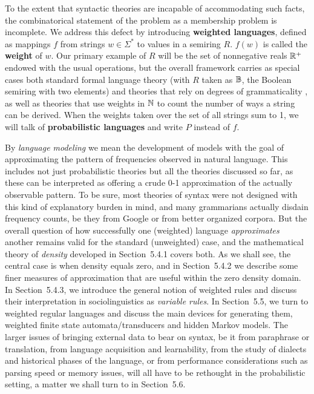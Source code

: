 To the extent that syntactic theories are incapable of accommodating such
facts, the combinatorical statement of the problem as a membership problem is
incomplete.  We address this defect by introducing {\bf weighted languages},
defined as mappings $f$ from strings $w \in \Sigma^*$ to values in a semiring
$R$. $f(w)$ is called the {\bf weight} of
$w$. Our primary example
of $R$ will be the set of nonnegative reals ${\Bbb R}^+$ endowed with the
usual operations, but the overall framework carries as special cases both
standard formal language theory (with $R$ taken as ${\Bbb B}$, the Boolean
semiring with two elements) and theories that rely on degrees of grammaticality
\cite{Chomsky:1967}, as well as theories that use weights in ${\Bbb N}$ to
count the number of ways a string can be derived.\nocite{Chomsky:1963} When
the weights taken over the set of all strings sum to 1, we will talk of {\bf
  probabilistic languages} and write $P$ instead of $f$.

By {\it language modeling} we mean the development of models with the goal of
approximating the pattern of frequencies observed in natural language. This
includes not just probabilistic theories but all the theories discussed so
far, as these can be interpreted as offering a crude 0-1 approximation of the
actually observable pattern. To be sure, most theories of syntax were not
designed with this kind of explanatory burden in mind, and many grammarians
actually disdain frequency counts, be they from Google or from better
organized corpora. But the overall question of how successfully one (weighted)
language {\it approximates} another remains valid for the standard
(unweighted) case, and the mathematical theory of {\it density} developed in
Section~5.4.1 covers both. As we shall see, the central case is when density
equals zero, and in Section~5.4.2 we describe some finer measures of
approximation that are useful within the zero density domain. In Section~5.4.3,
we introduce the general notion of weighted rules and discuss their
interpretation in sociolinguistics as {\it variable rules}. In Section~5.5, we
turn to weighted regular languages and discuss the main devices for generating
them, weighted finite state automata/transducers and hidden Markov models.
The larger issues of bringing external data to bear on syntax, be it from
paraphrase or translation, from language acquisition and learnability, from
the study of dialects and historical phases of the language, or from
performance considerations such as parsing speed or memory issues, will all
have to be rethought in the probabilistic setting, a matter we shall turn to
in Section~5.6.

